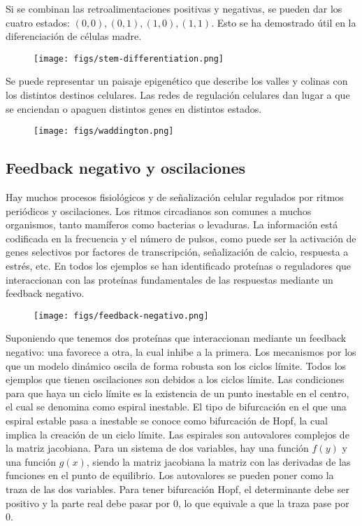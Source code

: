 Si se combinan las retroalimentaciones positivas y negativas, se pueden dar los cuatro estados: $(0,0), (0,1), (1,0), (1,1)$. Esto se ha demostrado útil en la diferenciación de células madre.

\begin{figure}[h]
\centering
\texttt{[image: figs/stem-differentiation.png]}
\end{figure}

Se puede representar un paisaje epigenético que describe los valles y colinas con los distintos destinos celulares. Las redes de regulación celulares dan lugar a que se enciendan o apaguen distintos genes en distintos estados. 

\begin{figure}[h]
\centering
\texttt{[image: figs/waddington.png]}
\end{figure}

\subsection{Feedback negativo y oscilaciones}
Hay muchos procesos fisiológicos y de señalización celular regulados por ritmos periódicos y oscilaciones. Los ritmos circadianos son comunes a muchos organismos, tanto mamíferos como bacterias o levaduras. La información está codificada en la frecuencia y el número de pulsos, como puede ser la activación de genes selectivos por factores de transcripción, señalización de calcio, respuesta a estrés, etc. En todos los ejemplos se han identificado proteínas o reguladores que interaccionan con las proteínas fundamentales de las respuestas mediante un feedback negativo. 

\begin{figure}[h]
\centering
\texttt{[image: figs/feedback-negativo.png]}
\end{figure}

Suponiendo que tenemos dos proteínas que interaccionan mediante un feedback negativo: una favorece a otra, la cual inhibe a la primera. Los mecanismos por los que un modelo dinámico oscila de forma robusta son los ciclos límite. Todos los ejemplos que tienen oscilaciones son debidos a los ciclos límite. Las condiciones para que haya un ciclo límite es la existencia de un punto inestable en el centro, el cual se denomina como espiral inestable. El tipo de bifurcación en el que una espiral estable pasa a inestable se conoce como bifurcación de Hopf, la cual implica la creación de un ciclo límite. Las espirales son autovalores complejos de la matriz jacobiana. Para un sistema de dos variables, hay una función $f(y)$ y una función $g(x)$, siendo la matriz jacobiana la matriz con las derivadas de las funciones en el punto de equilibrio. Los autovalores se pueden poner como la traza de las dos variables. Para tener bifurcación Hopf, el determinante debe ser positivo y la parte real debe pasar por 0, lo que equivale a que la traza pase por 0. 

